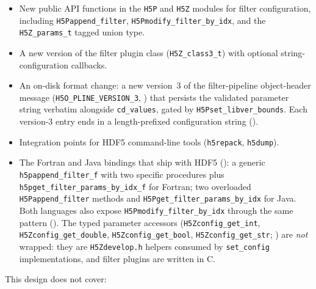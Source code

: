 \documentclass[../RFC-HDFG-2026-001.tex]{subfiles}
\begin{document}
\begin{itemize}
\item New public API functions in the \texttt{H5P} and \texttt{H5Z} modules for
  filter configuration, including \texttt{H5Pappend\_filter},
  \texttt{H5Pmodify\_filter\_by\_idx}, and the \texttt{H5Z\_params\_t} tagged
  union type.
\item A new version of the filter plugin class (\texttt{H5Z\_class3\_t}) with optional
  string-configuration callbacks.
\item An on-disk format change: a new version~3 of the filter-pipeline
  object-header message (\texttt{H5O\_PLINE\_VERSION\_3},
  ) that persists the validated parameter string
  verbatim alongside \texttt{cd\_values}, gated by
  \texttt{H5Pset\_libver\_bounds}.  Each version-3 entry ends in a
  length-prefixed configuration string
  ().
\item Integration points for HDF5 command-line tools (\texttt{h5repack}, \texttt{h5dump}).
\item The Fortran and Java bindings that ship with HDF5
  (): a generic
  \texttt{h5pappend\_filter\_f} with two specific procedures plus
  \texttt{h5pget\_filter\_params\_by\_idx\_f} for Fortran; two overloaded
  \texttt{H5Pappend\_filter} methods and
  \texttt{H5Pget\_filter\_params\_by\_idx} for Java.  Both languages also
  expose \texttt{H5Pmodify\_filter\_by\_idx} through the same pattern
  ().  The typed parameter accessors
  (\texttt{H5Zconfig\_get\_int}, \texttt{H5Zconfig\_get\_double},
  \texttt{H5Zconfig\_get\_bool}, \texttt{H5Zconfig\_get\_str};
  ) are \emph{not} wrapped: they are
  \texttt{H5Zdevelop.h} helpers consumed by \texttt{set\_config}
  implementations, and filter plugins are written in C.
\end{itemize}

This design does not cover:
\end{document}
